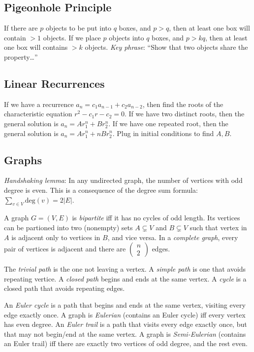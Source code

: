 \documentclass[10pt,letterpaper,twocolumn]{article}
\newcommand{\bico}[2]
    {\begin{pmatrix}#1 \\ #2\end{pmatrix}}
\begin{document}
\subsection{Pigeonhole Principle} 

If there are $ p $ objects to be put into $ q $ 
boxes, and $ p > q $, then at least one box 
will contain $ > 1 $ objects. If we place $ p $ 
objects into $ q $ boxes, and $ p > kq $, then 
at least one box will contains $ > k $ objects. 
\emph{Key phrase}: ``Show that two objects share 
the property\dots''


\subsection{Linear Recurrences} 

If we have a recurrence 
$ a_n = c_1a_{n-1} + c_2a_{n-2} $, 
then find the roots of the characteristic 
equation $ r^2 - c_1r - c_2 = 0 $. If we
have two distinct roots, then the general 
solution is $ a_n = Ar_1^n + Br_2^n $. 
If we have one repeated root, then the 
general solution is $ a_n = Ar_1^n + nBr_2^n $.
Plug in initial conditions to find $ A, B $. 


\subsection{Graphs}

\emph{Handshaking lemma}: In any undirected graph, 
the number of vertices with odd degree is even. 
This is a consequence of the degree sum formula: 
$ \sum_{v \in V} \textrm{deg}(v) = 2 |E| $.

A graph $ G = (V, E) $ is \emph{bipartite} 
iff it has no cycles of odd length. 
Its vertices can be partioned into 
two (nonempty) sets 
$ A \subsetneq V $ and $ B \subsetneq V $ such that
vertex in $ A $ is adjacent only to vertices in $ B $,
and vice versa.
In a \emph{complete graph}, every pair of vertices
is adjacent and there are $ \bico{n}{2} $ edges.

The \emph{trivial path} is the one not 
leaving a vertex.
A \emph{simple path} is one that avoids 
repeating vertice.
A \emph{closed path} begins and ends at the 
same vertex. 
A \emph{cycle} is a closed path that avoids 
repeating edges.

An \emph{Euler cycle} is a path that
begins and ends at the same vertex, visiting 
every edge exactly once. A graph is \emph{Eulerian} 
(contains an Euler cycle) iff every vertex has 
even degree. An \emph{Euler trail} is a path 
that visits every edge exactly once, 
but that may not begin/end at the same vertex. 
A graph is \emph{Semi-Eulerian} 
(contains an Euler trail) iff there are exactly 
two vertices of odd degree, and the rest even.
\end{document}

